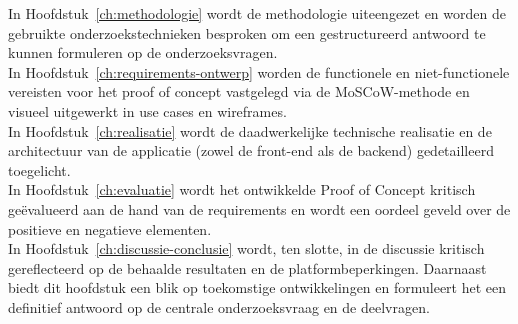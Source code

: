 In Hoofdstuk~\ref{ch:methodologie} wordt de methodologie uiteengezet en worden de gebruikte onderzoekstechnieken besproken om een gestructureerd antwoord te kunnen formuleren op de onderzoeksvragen.
\\

In Hoofdstuk~\ref{ch:requirements-ontwerp} worden de functionele en niet-functionele vereisten voor het proof of concept vastgelegd via de MoSCoW-methode en visueel uitgewerkt in use cases en wireframes.
\\

In Hoofdstuk~\ref{ch:realisatie} wordt de daadwerkelijke technische realisatie en de architectuur van de applicatie (zowel de front-end als de backend) gedetailleerd toegelicht.
\\

In Hoofdstuk~\ref{ch:evaluatie} wordt het ontwikkelde Proof of Concept kritisch geëvalueerd aan de hand van de requirements en wordt een oordeel geveld over de positieve en negatieve elementen.
\\

In Hoofdstuk~\ref{ch:discussie-conclusie} wordt, ten slotte, in de discussie kritisch gereflecteerd op de behaalde resultaten en de platformbeperkingen. Daarnaast biedt dit hoofdstuk een blik op toekomstige ontwikkelingen en formuleert het een definitief antwoord op de centrale onderzoeksvraag en de deelvragen.